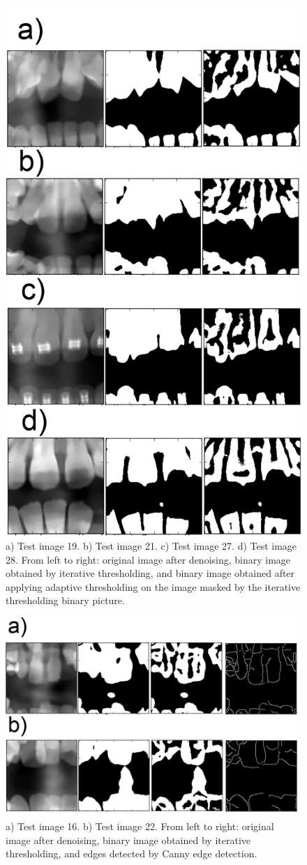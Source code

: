 \documentclass[a4paper,11pt,twoside]{article}
\begin{document}
\begin{figure}
\centering
\includegraphics[width=0.65\columnwidth]{adaptive.png}
\caption{a) Test image 19. b) Test image 21. c) Test image 27. d) Test image 28. From left to right: original image after denoising, binary image obtained by iterative thresholding, and binary image obtained after applying adaptive thresholding on the image masked by the iterative thresholding binary picture.}
\label{adaptive}
\end{figure}

\begin{figure}
\centering
\includegraphics[width=0.65\columnwidth]{thresholding.png}
\caption{a) Test image 16. b) Test image 22. From left to right: original image after denoising, binary image obtained by iterative thresholding, and edges detected by Canny edge detection.}
\label{thresholding}
\end{figure}
\end{document}
